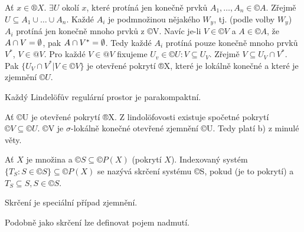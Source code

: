\documentclass[12pt]{article}                   %
\begin{document}
\begin{veta}
\begin{dukazin}
                    Ať $x \in ®X$. $\exists U$ okolí $x$, které protíná jen konečně prvků $A_1, …, A_n \in ©A$. Zřejmě $U \subseteq A_1 \cup … \cup A_n$. Každé $A_i$ je podmnožinou nějakého $W_y$, tj. (podle volby $W_y$) $A_i$ protíná jen konečně mnoho prvků z ©V. Navíc je-li $V \in ©V$ a $A \in ©A$, že $A \cap V = \emptyset$, pak $A \cap V^* = \emptyset$. Tedy každé $A_i$ protíná pouze konečně mnoho prvků $V^*$, $V \in @V$. Pro každé $V \in @V$ fixujeme $U_v \in ©U: V \subseteq U_V$. Zřejmě $V \subseteq U_V \cap V^*$. Pak $\{U_V \cap V^* | V \in ©V\}$ je otevřené pokrytí ®X, které je lokálně konečné a které je zjemnění $©U$.
        \end{dukazin}
    \end{veta}

    \begin{dusledek}
        Každý Lindelöfův regulární prostor je parakompaktní.

        \begin{dukazin}
            Ať ©U je otevřené pokrytí ®X. Z lindolöfovosti existuje spočetné pokrytí $©V \subseteq ©U$. ©V je $\sigma$-lokálně konečné otevřené zjemnění ©U. Tedy platí b) z minulé věty.
        \end{dukazin}
    \end{dusledek}

    \begin{definice}[Skrčení]
        Ať $X$ je množina a $©S \subseteq ©P(X)$ (pokrytí $X$). Indexovaný systém $\{T_S: S \in ©S\} \subseteq ©P(X)$ se nazývá skrčení systému ©S, pokud (je to pokrytí) a $T_S \subseteq S, S \in ©S$.
    \end{definice}

    \begin{poznamka}[Nadmutí]
        Skrčení je speciální případ zjemnění.

        Podobně jako skrčení lze definovat pojem nadmutí.
    \end{poznamka}
\end{document}
